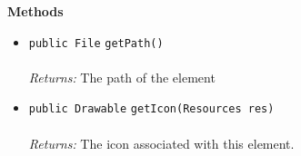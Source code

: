 \textbf{\sffamily Methods}
\begin{itemize}
\item \lstinline|public File| \lstinline|getPath|\lstinline|()|\\ \\[-0.6em]
\emph{Returns:} The path of the element



\item \lstinline|public Drawable| \lstinline|getIcon|\lstinline|(Resources res)|\\ \\[-0.6em]
\emph{Returns:} The icon associated with this element.



\end{itemize}



